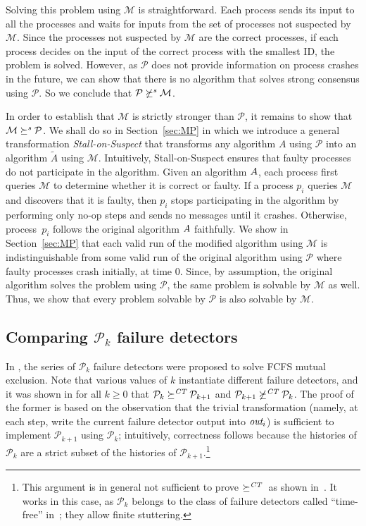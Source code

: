 \documentclass[11pt]{article}
\newcommand{\ident}[1]{\textit{#1}\rule{0cm}{1ex}}
\newcommand{\PFD}{\ensuremath{\mathcal{P}}}
\newcommand{\MFD}{\ensuremath{\mathcal{M}}}
\newcommand{\redCT}{\succeq^\ident{CT}}
\newcommand{\redSolv}{\succeq^{\ident{s}}}
\begin{document}
Solving this problem using $\MFD$ is straightforward.
Each process sends its input to all the processes and waits for inputs
     from  the set of processes not suspected by $\MFD$.
Since the processes not suspected by $\MFD$ are the correct processes,
     if each process decides on the input of the correct process with
     the smallest ID, the problem is solved.
However, as $\PFD$ does not provide information on process crashes in
     the future, we can show that there is no algorithm that solves
     strong consensus using $\PFD$.
So we conclude that $\PFD\not\redSolv\MFD$.

In order to establish that $\MFD$ is strictly stronger than $\PFD$, it
     remains to show that $\MFD\redSolv\PFD$.
We shall do so in Section~\ref{sec:MP} in which we introduce a general
     transformation \emph{Stall-on-Suspect} that transforms any
     algorithm $A$ using $\PFD$ into an algorithm $\tilde{A}$ using
     $\MFD$.
Intuitively, Stall-on-Suspect ensures that faulty processes do not
     participate in the algorithm.
Given an algorithm $A$, each process first queries $\MFD$ to
     determine whether it is correct or faulty.
If a process $p_i$ queries $\MFD$ and discovers that it is faulty,
     then $p_i$ stops participating in the algorithm by performing
     only no-op steps and sends no messages until it crashes.
Otherwise, process~$p_i$ follows the original algorithm $A$
     faithfully.
We show in Section~\ref{sec:MP} that each valid run of the modified
     algorithm using $\MFD$ is indistinguishable from some valid run
     of the original algorithm using $\PFD$ where faulty processes
     crash initially, at time $0$.
Since, by assumption, the original algorithm solves the  problem using
     $\PFD$, the same problem is solvable by $\MFD$ as well.
Thus, we show that every problem solvable by $\PFD$ is also solvable
     by $\MFD$.

\subsection{Comparing $\PFD_k$ failure detectors}

In \cite{bhatt:oteow}, the series of $\PFD_k$ failure detectors were
     proposed to solve FCFS mutual exclusion.
Note that various values of $k$ instantiate different failure
     detectors, and it was shown in \cite{bhatt:oteow} for all $k\ge
     0$ that $\PFD_{k} \redCT \PFD_{k+1}$ and $\PFD_{k+1}
     \not\redCT \PFD_{k}$.
The proof of the former is based on the observation that the trivial
     transformation (namely, at each step, write the current failure detector
     output into $\ident{out}_i$) is sufficient to implement
     $\PFD_{k+1}$ using $\PFD_k$; intuitively, correctness follows because the histories of
     $\PFD_k$ are a strict subset of the histories of
     $\PFD_{k+1}$.\footnote{This argument is in general not sufficient
     to prove $\redCT$ as shown in~\cite{charron-bost:10:isolt}.
It works in this case, as $\PFD_k$ belongs to the class of failure
     detectors called ``time-free'' in~\cite{charron-bost:10:isolt};
     they allow finite stuttering.}
\end{document}
